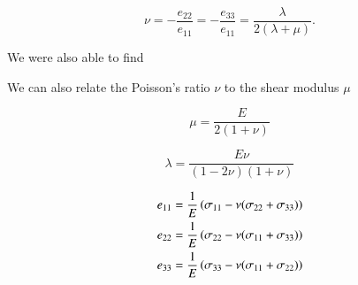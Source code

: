 \begin{equation}\label{eqn:continuumElasticityReview:430}
\nu = -\frac{e_{22}}{e_{11}} = -\frac{e_{33}}{e_{11}} = \frac{\lambda}{2(\lambda + \mu)}.
\end{equation}

We were also able to find

We can also relate the Poisson's ratio $\nu$ to the shear modulus $\mu$

\begin{equation}\label{eqn:continuumElasticityReview:450}
\mu = \frac{E}{2(1 + \nu)}
\end{equation}

\begin{equation}\label{eqn:continuumElasticityReview:470}
\lambda = \frac{E \nu}{(1 - 2 \nu)(1 + \nu)}
\end{equation}

\begin{align}\label{eqn:continuumElasticityReview:490}
e_{11} &= \frac{1}{E}\left( \sigma_{11} - \nu(\sigma_{22} + \sigma_{33}) \right) \\
e_{22} &= \frac{1}{E}\left( \sigma_{22} - \nu(\sigma_{11} + \sigma_{33}) \right) \\
e_{33} &= \frac{1}{E}\left( \sigma_{33} - \nu(\sigma_{11} + \sigma_{22}) \right)
\end{align}

